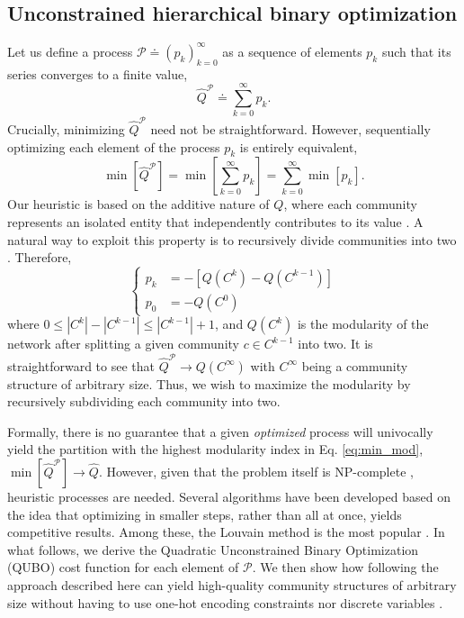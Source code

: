 \documentclass[pdflatex,sn-mathphys-num]{sn-jnl}%
\begin{document}
\subsection*{Unconstrained hierarchical binary optimization}
Let us define a process $\mathcal{P} \doteq (p_k)_{k=0}^{\infty}$ as a sequence of elements $p_k$ such that its series converges to a finite value,
\begin{equation} \label{eq:process_P}
    \hat{Q}^{\mathcal{P}} \doteq \sum_{k=0}^{\infty} p_k. 
\end{equation} Crucially, minimizing $\hat{Q}^{\mathcal{P}}$ need not be straightforward. However, sequentially optimizing each element of the process $p_k$ is entirely equivalent,
\begin{equation} \label{eq:min_process}
    \min \left[ \hat{Q}^{\mathcal{P}} \right] = \min\left[\sum_{k=0}^{\infty} p_k \right] = \sum_{k=0}^{\infty}  \min \left[ p_k \right]. 
\end{equation} Our heuristic is based on the additive nature of $Q$, where each community represents an isolated entity that independently contributes to its value \cite{Newman2004}. A natural way to exploit this property is to recursively divide communities into two \cite{Newman2006}. Therefore, 
\begin{equation} \label{eq:p_k}
    \begin{cases}
        p_k &= -\left[ Q(C^{k}) - Q(C^{k-1}) \right]\\
        p_{0} &= -Q(C^{0})
    \end{cases}
\end{equation} where $0 \leq |C^{k}| - |C^{k-1}| \leq |C^{k-1}| + 1$, and $Q(C^{k})$ is the modularity of the network after splitting a given community $c \in C^{k-1}$ into two. It is straightforward to see that $\hat{Q}^\mathcal{P} \to Q(C^{\infty})$ with $C^{\infty}$ being a community structure of arbitrary size. Thus, we wish to maximize the modularity by recursively subdividing each community into two. 

Formally, there is no guarantee that a given \textit{optimized} process will univocally yield the partition with the highest modularity index in Eq. \ref{eq:min_mod}, $\min \left[ \hat{Q}^{\mathcal{P}} \right] \to \hat{Q}$. 
However, given that the problem itself is NP-complete \cite{Brandes2008}, heuristic processes are needed. Several algorithms have been developed based on the idea that optimizing in smaller steps, rather than all at once, yields competitive results. Among these, the Louvain method is the most popular \cite{Blondel2008}. In what follows, we derive the Quadratic Unconstrained Binary Optimization (QUBO) cost function for each element of $\mathcal{P}$. We then show how following the approach described here can yield high-quality community structures of arbitrary size without having to use one-hot encoding constraints \cite{Ushijima-Mwesigwa2017,Negre2020} nor discrete variables \cite{Wierzbinski2023}.  
\end{document}
